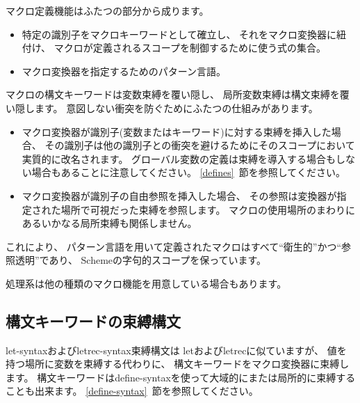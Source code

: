 マクロ定義機能はふたつの部分から成ります。

\begin{itemize}
\item 特定の識別子をマクロキーワードとして確立し、
それをマクロ変換器に紐付け、
マクロが定義されるスコープを制御するために使う式の集合。

\item マクロ変換器を指定するためのパターン言語。
\end{itemize}

マクロの構文キーワードは変数束縛を覆い隠し、
局所変数束縛は構文束縛を覆い隠します。
意図しない衝突を防ぐためにふたつの仕組みがあります。

\begin{itemize}

\item マクロ変換器が識別子(変数またはキーワード)に対する束縛を挿入した場合、
その識別子は他の識別子との衝突を避けるためにそのスコープにおいて実質的に改名されます。
グローバル変数の定義は束縛を導入する場合もしない場合もあることに注意してください。
\ref{defines}~節を参照してください。

\item マクロ変換器が識別子の自由参照を挿入した場合、
その参照は変換器が指定された場所で可視だった束縛を参照します。
マクロの使用場所のまわりにあるいかなる局所束縛も関係しません。

\end{itemize}

これにより、
パターン言語を用いて定義されたマクロはすべて``衛生的''かつ``参照透明''であり、
Schemeの字句的スコープを保っています。\cite{Kohlbecker86,
hygienic,Bawden88,macrosthatwork,syntacticabstraction}

処理系は他の種類のマクロ機能を用意している場合もあります。

\subsection{構文キーワードの束縛構文}
\label{bindsyntax}

{\cf let-syntax}および{\cf letrec-syntax}束縛構文は
{\cf let}および{\cf letrec}に似ていますが、
値を持つ場所に変数を束縛する代わりに、
構文キーワードをマクロ変換器に束縛します。
構文キーワードは{\cf define-syntax}を使って大域的にまたは局所的に束縛することも出来ます。
\ref{define-syntax}~節を参照してください。

